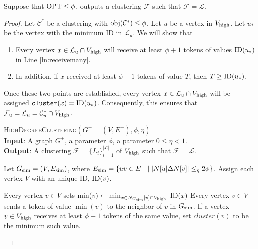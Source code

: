 \begin{lemma}\label{lem:efficienthighdeg} Suppose that $\mathrm{OPT} \leq \phi$.  outputs a clustering $\mathcal{F}$ such that $\mathcal{F} = \mathcal{L}$. \end{lemma}

\begin{proof}
Let $\mathcal{C}^{*}$ be a clustering with $\mathrm{obj}(\mathcal{C}^{*})\leq \phi$.  Let $u$ be a vertex in $V_{\operatorname{high}}$. 
Let $u_{*}$ be the vertex with the minimum ID in $\mathcal{L}_u$. We will show that 
\begin{enumerate}
    \item Every vertex $x \in \mathcal{L}_u \cap V_{\operatorname{high}}$ will receive at least $\phi + 1$ tokens of values $\operatorname{\text{{\rm ID}}}(u_{*})$ in Line \ref{ln:receivemany}.
    \item In addition, if $x$ received at least $\phi + 1$ tokens of value $T$, then $T \geq \operatorname{\text{{\rm ID}}}(u_{*})$. 
\end{enumerate} 

Once these two points are established, every vertex $x \in \mathcal{L}_u \cap V_{\operatorname{high}}$ will be assigned $\texttt{cluster}(x) = \operatorname{\text{{\rm ID}}}(u_*)$. Consequently, this ensures that $\mathcal{F}_u = \mathcal{L}_u = \mathcal{C}^*_u \cap V_{\operatorname{high}}$.

\begin{algorithm}[ht!]
\caption{{\textsc{HighDegreeClustering}}$(G^+=(V, E^+), \phi, \eta)$\label{alg:highdegreecluster}\\
\textbf{Input}: A graph $G^{+}$, a parameter $\phi$, a parameter $0 \leq \eta < 1$. \\
\textbf{Output}: A clustering $\mathcal{F} = \{L_i\}_{i=1}^{|\mathcal{L}|}$ of $V_{\operatorname{high}}$ such that $\mathcal{F} = \mathcal{L}$. }
\label{alg:highdegclustering}
\begin{algorithmic}[1]
    \State Let $G_{\operatorname{sim}} = (V,E_{\operatorname{sim}})$, where $E_{\operatorname{sim}} = \{uv \in E^{+} \mid |N[u] \Delta N[v] | \leq_{\eta} 2\phi \}$. \label{ln:2} 
    \State Assign each vertex $V$ with an unique ID, $\operatorname{\text{{\rm ID}}}(v)$.

    \State \label{ln:learnID}Every vertex $v \in V$ sets $\min(v) \leftarrow \min_{x \in N_{G_{\operatorname{sim}}}[v] \cap V_{\operatorname{high}}}\ \operatorname{\text{{\rm ID}}}(x) $
    \State Every vertex $v \in V$ sends a token of value $\min(v)$ to the neighbor of $v$ in $G_{\operatorname{sim}}$.
    \State \label{ln:receivemany}If a vertex $v \in V_{\operatorname{high}}$ receives at least $\phi + 1$ tokens of the same value, set $cluster(v)$ to be the minimum such value. 
    

\end{algorithmic}
\end{algorithm}
\end{proof}
